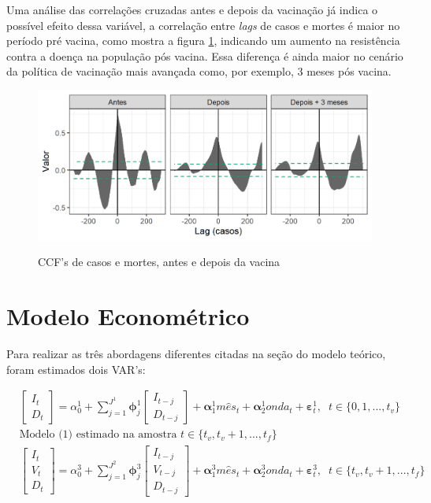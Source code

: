 \documentclass[
	12pt,				%
	oneside,			%
	a4paper,			%
	english,			%
	brazil				%
	hyperref = {colorlinks, citecolor=c1d, linkcolor=c2d, urlcolor=c3d, colorlinks}
	]{abntex2}
\newcounter{j}
\begin{document}
Uma análise das correlações cruzadas antes e depois da vacinação já indica o possível efeito dessa variável, a correlação entre \textit{lags} de casos e mortes é maior no período pré vacina, como mostra a figura \ref{fig:ccfad}, indicando um aumento na resistência contra a doença na população pós vacina. Essa diferença é ainda maior no cenário da política de vacinação mais avançada como, por exemplo, 3 meses pós vacina.

\begin{figure}[H]
    \centering
    \caption{CCF's de casos e mortes, antes e depois da vacina}
    \includegraphics[]{Figuras/ccfad.png} %
    \label{fig:ccfad}
\end{figure}



\let\clearpage\relax
\chapter{Modelo Econométrico}\label{sec:model}

Para realizar as três abordagens diferentes citadas na seção do modelo teórico, foram estimados dois VAR's:

\begin{align}
&\begin{bmatrix}
I_t \\ D_t
\end{bmatrix}
= \alpha_0^1 + \sum_{j=1}^{J^1}\pmb{\phi}_j^1
\begin{bmatrix}
I_{t-j} \\ D_{t-j}
\end{bmatrix}
+ \pmb{\alpha}^1_1m\hat{e}s_t + \pmb{\alpha}^1_2onda_t + \pmb{\varepsilon}_{t}^1, \;\; t \in \{0, 1, ..., t_v\} \label{eq:var1}\\
&\text{Modelo (1) estimado na amostra } t \in \{t_v, t_v+1, ..., t_f\}\label{eq:var2}\\
&\begin{bmatrix}
I_t \\ V_t \\ D_t
\end{bmatrix}
= \alpha_0^3 + \sum_{j=1}^{J^2}\pmb{\phi}_j^3
\begin{bmatrix}
I_{t-j} \\ V_{t-j} \\ D_{t-j}
\end{bmatrix}
+ \pmb{\alpha}^3_1m\hat{e}s_t + \pmb{\alpha}^3_2onda_t + \pmb{\varepsilon}_{t}^3, \;\; t \in \{t_v, t_v+1, ..., t_f\}\label{eq:var3}
\end{align}
\end{document}

